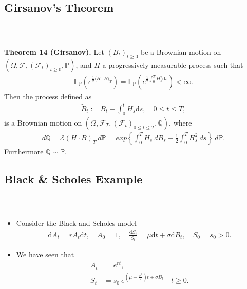 \documentclass{beamer}
\numberwithin{equation}{section}
\newenvironment{frame2}{\begin{frame}\frametitle{{\normalsize \secname} \\ {\large \subsecname}}}{\end{frame}}
\begin{document}
\subsection{Girsanov's Theorem}
\begin{frame2}
    \textbf{Theorem 14 (Girsanov).}
    Let $(B_t)_{t\geq 0}$ be a Brownian motion on $(\Omega, \mathscr{F}, (\mathscr{F}_t)_{t\geq 0}, \mathbb{P})$, and $H$ a progressively measurable process such that 
    \begin{align*}
        \mathbb{E}_{\mathbb{P}}(e^{\frac{1}{2}\langle H \cdot B \rangle_T}) = \mathbb{E}_{\mathbb{P}}(e^{\frac{1}{2}\int_0^T H_s^2 \text{d}s})<\infty.
    \end{align*}
    Then the process defined as
    \begin{align*}
        \tilde{B}_t:=B_t-\int_0^t H_s \text{d}s, \quad 0\leq t\leq T,
    \end{align*}
    is a Brownian motion on $(\Omega, \mathscr{F}_T, (\mathscr{F}_t)_{0\leq t\leq T}, \mathbb{Q})$, where
    \begin{align*}
        d\mathbb{Q}=\mathcal{E}(H\cdot B)_T \ d \mathbb{P} = exp\left\{\int_0^T H_s \ d B_s - \frac{1}{2} \int_0^T H_s^2 \ ds\right\} \ d \mathbb{P}.
    \end{align*}
    Furthermore $\mathbb{Q} \sim \mathbb{P}$.
\end{frame2}

\subsection{Black \& Scholes Example}
\begin{frame2}
    \begin{itemize}
        \item Consider the Black and Scholes model
        \begin{align*}
            \text{d}A_t=rA_t\text{d}t, \quad A_0=1, \quad \frac{\text{d}S_t}{S_t}=\mu \text{d}t+\sigma \text{d} B_t, \quad S_0=s_0>0.
        \end{align*}
        \item We have seen that
        \begin{align*}
            A_t&=e^{rt},\\
            S_t&=s_0 \ e^{(\mu-\frac{\sigma^2}{2})t+\sigma B_t} \quad t \geq 0.
        \end{align*}
    \end{itemize}
\end{frame2}
\end{document}
